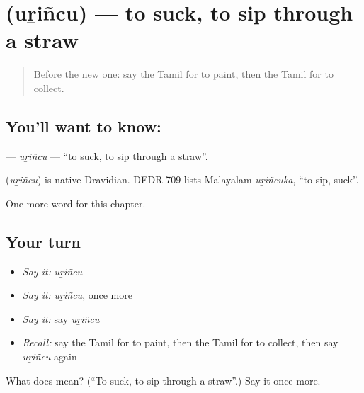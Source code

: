 \section[\texorpdfstring{\ta{உறிஞ்சு} (uṟiñcu)}{உறிஞ்சு (uṟiñcu)}]{ (uṟiñcu) — to suck, to sip through a straw}

\label{lesson:TA-C200-urincu}



\begin{quote}
Before the new one: say the Tamil for to paint, then the Tamil for to collect.
\end{quote}

\subsection*{You'll want to know: }
\textbf{} — \emph{uṟiñcu} — \textquotedblleft{}to suck, to sip through a straw\textquotedblright{}.

\begin{cousinweb}
\textbf{} (\emph{uṟiñcu}) is native Dravidian. DEDR 709 lists Malayalam \emph{uṟiñcuka}, \textquotedblleft{}to sip, suck\textquotedblright{}.
\end{cousinweb}

\begin{grammarlens}[title={What you've built}]
One more word for this chapter.
\end{grammarlens}

\subsection*{Your turn}
\begin{itemize}
\raggedright
  \item \emph{Say it:} \emph{uṟiñcu}
  \item \emph{Say it:} \emph{uṟiñcu}, once more
  \item \emph{Say it:} say \emph{uṟiñcu}
  \item \emph{Recall:} say the Tamil for to paint, then the Tamil for to collect, then say \emph{uṟiñcu} again
\end{itemize}

\begin{tcolorbox}[breakable,colback=teal!4,colframe=teal!35!black,title={Before you move on}]
What does  mean? (\textquotedblleft{}To suck, to sip through a straw\textquotedblright{}.) Say it once more.
\end{tcolorbox}
